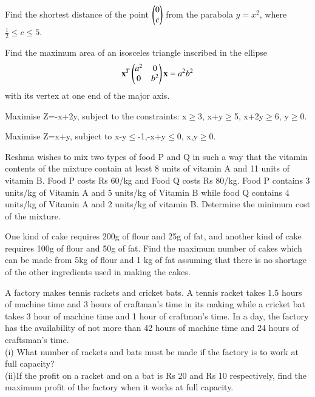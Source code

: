 \item Find the shortest distance of the point $\begin{pmatrix}0\\c\end{pmatrix}$ from the parabola $y = x^2$, where $\frac{1}{2} \le c \le 5$.
\item Find the maximum area of an isosceles triangle inscribed in the ellipse 
%
\begin{align}
\mathbf{x}^T\begin{pmatrix}a^2 & 0 \\ 0 & b^2\end{pmatrix}\mathbf{x} = a^2b^2
\end{align}
%
with its vertex at one end of the major axis.
\item Maximise Z=-x+2y, subject to the constraints:
x$\geq$3, x+y$\geq$5, x+2y$\geq$6, y$\geq$0.\\
\item Maximise Z=x+y, subject to x-y$\leq$-1,-x+y$\leq$0, x,y$\geq$0.\\
\item Reshma wishes to mix two types of food P and Q in such a way that the vitamin
contents of the mixture contain at least 8 units of vitamin A and 11 units of
vitamin B. Food P costs Rs 60/kg and Food Q costs Rs 80/kg. Food P contains
3 units/kg of Vitamin A and 5 units/kg of Vitamin B while food Q contains
4 units/kg of Vitamin A and 2 units/kg of vitamin B. Determine the minimum cost
of the mixture.\\
\solution


\item One kind of cake requires 200g of flour and 25g of fat, and another kind of cake
requires 100g of flour and 50g of fat. Find the maximum number of cakes which
can be made from 5kg of flour and 1 kg of fat assuming that there is no shortage
of the other ingredients used in making the cakes.\\
\solution


\item A factory makes tennis rackets and cricket bats. A tennis racket takes 1.5 hours
of machine time and 3 hours of craftman’s time in its making while a cricket bat
takes 3 hour of machine time and 1 hour of craftman’s time. In a day, the factory
has the availability of not more than 42 hours of machine time and 24 hours of
craftsman’s time.\\
(i) What number of rackets and bats must be made if the factory is to work
at full capacity?\\
(ii)If the profit on a racket and on a bat is Rs 20 and Rs 10 respectively, find
the maximum profit of the factory when it works at full capacity.\\
\solution


